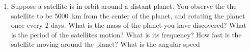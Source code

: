 \begin{enumerate}
\item 
Suppose a satellite is in orbit around a distant planet. You observe the the satellite to be \SI{5000}{\kilo\meter} from the 
center of the planet, and rotating the planet once every 2 days. What is the mass of the planet you have discovered? What is the period of the satellites motion? What is its frequency? How fast is the satellite moving around the planet? What is the angular speed



\end{enumerate}
